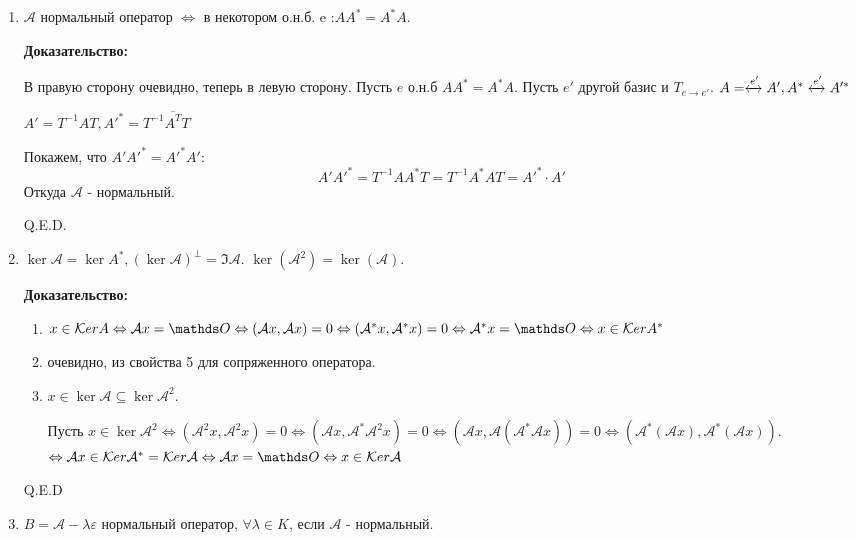 \begin{enumerate}
    \item $\mathcal{A}$ нормальный оператор $\Leftrightarrow$ в некотором о.н.б. e :$A A^* = A^*A$.

    \textbf{Доказательство:}

    В правую сторону очевидно, теперь в левую сторону. Пусть $e$ о.н.б $A A^* =A^* A$. Пусть $e'$ другой базис и $T_{e\rightarrow{}e'}$. $A =\xleftrightarrow[]{e'}A', A^* \xleftrightarrow[]{e'}A'^*$

    $A' = T^{-1}AT, A'^* = T^{-1}\overline{A^T}T$

    Покажем, что $A'A'^* = A'^*A':$
    $$A'A'^* = T^{-1}A A^*T = T^{-1}A^*AT = A'^*\cdot A'$$
    Откуда $\mathcal{A}$ - нормальный.
    
    \hfill Q.E.D.

    \item $\ker \mathcal{A} = \ker A^*,(\ker \mathcal{A})^\perp = \Im \mathcal{A}$. $\ker (\mathcal{A}^2)=\ker (\mathcal{A})$.

    \textbf{Доказательство:}

    \begin{enumerate}
        \item $x\in \ker A \Leftrightarrow \mathcal{A}x = \zero \Leftrightarrow (\mathcal{A}x, \mathcal{A}x) = 0 \Leftrightarrow (\mathcal{A}^*x, \mathcal{A}^*x) = 0 \Leftrightarrow \mathcal{A}^*x = \zero \Leftrightarrow x\in \ker A^*$

        \item очевидно, из свойства 5 для сопряженного оператора.
        \item $x\in \ker \mathcal{A}\subseteq \ker \mathcal{ A}^2$.

        Пусть $x \in \ker \mathcal{A}^2 \Leftrightarrow (\mathcal{A}^2 x, \mathcal{A}^2x) = 0 \Leftrightarrow (\mathcal{A}x, \mathcal{A}^* \mathcal{A}^2x) = 0 \Leftrightarrow (\mathcal{A}x, \mathcal{A}(\mathcal{A}^*\mathcal{A}x)) = 0 \Leftrightarrow (\mathcal{A}^*(\mathcal{A}x),\mathcal{A}^*(\mathcal{A}x))$.
        $\Leftrightarrow \mathcal{A}x \in \ker \mathcal{A}^* =\ker \mathcal{A} \Leftrightarrow \mathcal{A}x = \zero \Leftrightarrow x \in \ker \mathcal{A}$
    \end{enumerate}

    \hfill Q.E.D

    \item   $B = \mathcal{A}-\lambda \varepsilon$ нормальный оператор, $\forall \lambda \in K$, если $\mathcal{A}$ - нормальный.


\end{enumerate}
